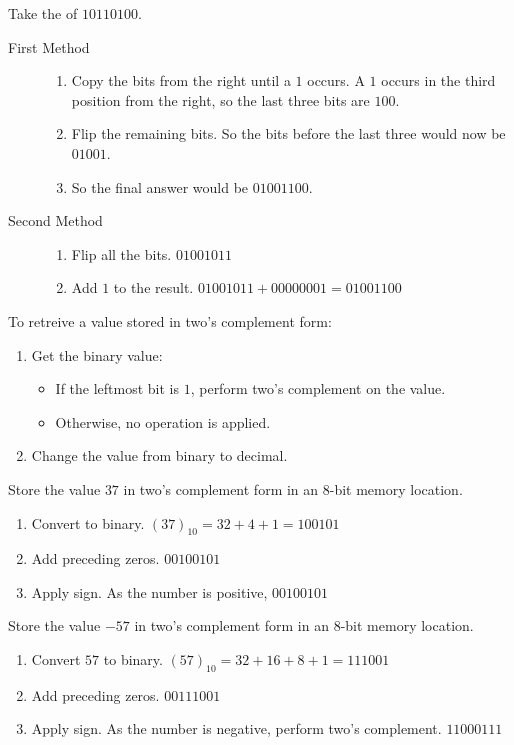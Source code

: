 \documentclass[../notes.tex]{subfiles}
\begin{document}
					\begin{example}
						Take the  of $10110100$.
						\begin{description}
							\item[First Method] 
								\begin{enumerate}
									\item Copy the bits from the right until a $1$ occurs. A $1$ occurs in the third position from the right, so the last three bits are $100$.
									\item Flip the remaining bits. So the bits before the last three would now be $01001$.
									\item So the final answer would be $01001100$.
								\end{enumerate}
							\item[Second Method]
								\begin{enumerate}
									\item Flip all the bits. $01001011$
									\item Add $1$ to the result. $01001011 + 00000001 = 01001100$
								\end{enumerate}
						\end{description}
					\end{example}
					To retreive a value stored in two's complement form:
					\begin{enumerate}
						\item Get the binary value:
							\begin{itemize}
								\item If the leftmost bit is $1$, perform two's complement on the value.
								\item Otherwise, no operation is applied.
							\end{itemize}
						\item Change the value from binary to decimal.
					\end{enumerate}
					\pagebreak
					\begin{example}
						Store the value $37$ in two's complement form in an $8$-bit memory location.
						\begin{enumerate}
							\item Convert to binary. $(37)_{10} = 32 + 4 + 1 = 100101$
							\item Add preceding zeros. $00100101$
							\item Apply sign. As the number is positive, $00100101$
						\end{enumerate}
					\end{example}
					\begin{example}
						Store the value $-57$ in two's complement form in an $8$-bit memory location.
						\begin{enumerate}
							\item Convert $57$ to binary. $(57)_{10} = 32 + 16 + 8 + 1 = 111001$
							\item Add preceding zeros. $00111001$
							\item Apply sign. As the number is negative, perform two's complement. $11000111$
						\end{enumerate}
					\end{example}
\end{document}
